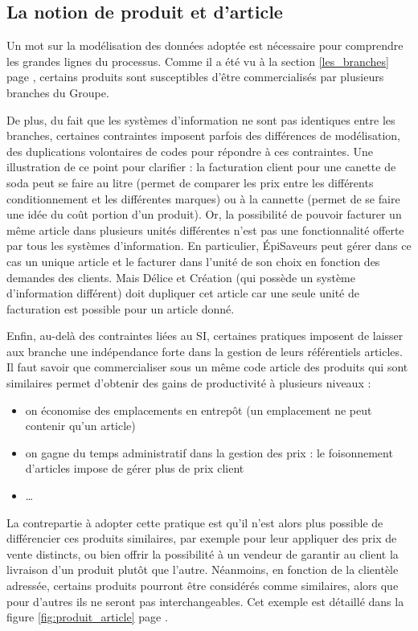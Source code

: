             \subsection{La notion de produit et d'article}

            Un mot sur la modélisation des données adoptée est nécessaire pour comprendre les grandes lignes du processus.
            Comme il a été vu à la section \ref{les_branches} page \pageref{les_branches}, certains produits sont susceptibles d'être commercialisés par plusieurs branches du Groupe.
            
            De plus, du fait que les systèmes d'information ne sont pas identiques entre les branches, certaines contraintes imposent parfois des différences de modélisation, des duplications volontaires de codes pour répondre à ces contraintes.
            Une illustration de ce point pour clarifier : la facturation client pour une canette de soda peut se faire au litre (permet de comparer les prix entre les différents conditionnement et les différentes marques) ou à la cannette (permet de se faire une idée du coût portion d'un produit).
            Or, la possibilité de pouvoir facturer un même article dans plusieurs unités différentes n'est pas une fonctionnalité offerte par tous les systèmes d'information.
            En particulier, \'{E}piSaveurs peut gérer dans ce cas un unique article et le facturer dans l'unité de son choix en fonction des demandes des clients.
            Mais Délice et Création (qui possède un système d'information différent) doit dupliquer cet article car une seule unité de facturation est possible pour un article donné.

            Enfin, au-delà des contraintes liées au SI, certaines pratiques imposent de laisser aux branche une indépendance forte dans la gestion de leurs référentiels articles.
            Il faut savoir que commercialiser sous un même code article des produits qui sont similaires permet d'obtenir des gains de productivité à plusieurs niveaux :
            \begin{itemize}
                \item on économise des emplacements en entrepôt (un emplacement ne peut contenir qu'un article)
                \item on gagne du temps administratif dans la gestion des prix : le foisonnement d'articles impose de gérer plus de prix client
                \item \dots
            \end{itemize}
            La contrepartie à adopter cette pratique est qu'il n'est alors plus possible de différencier ces produits similaires, par exemple pour leur appliquer des prix de vente distincts, ou bien offrir la possibilité à un vendeur de garantir au client la livraison d'un produit plutôt que l'autre.
            Néanmoins, en fonction de la clientèle adressée, certains produits pourront être considérés comme similaires, alors que pour d'autres ils ne seront pas interchangeables.
            Cet exemple est détaillé dans la figure \ref{fig:produit_article} page \pageref{fig:produit_article}.

